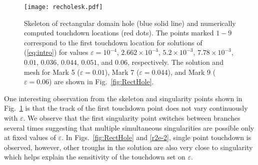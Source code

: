\documentclass{siamart0516}
\renewcommand{\eqref}[1]{(\ref{#1})}
\newcommand{\eps}{\varepsilon}
\theoremstyle{plain}%
\theoremstyle{definition}
\theoremstyle{remark}
\begin{document}

\begin{figure}[htbp]
\centering
\texttt{[image: recholesk.pdf]}
\caption{Skeleton of rectangular domain hole (blue solid line) and numerically computed touchdown locations (red dots).
The points marked $1-9$ correspond to the first touchdown location for solutions of \eqref{eq:intro} for values $\eps = 10^{-4}$, $2.662 \times 10^{-3}$, $5.2 \times 10^{-3}$, $7.78 \times 10^{-3}$, $0.01$, $0.036$, $0.044$, $0.051$, and $0.06$, respectively.
The solution and mesh for Mark 5 ($\eps = 0.01$), Mark 7 ($\eps = 0.044$), and
Mark 9 ($\eps = 0.06$) are shown in Fig.~\ref{fig:RectHole}.
\label{recsk}}
\end{figure}


One interesting observation from the skeleton and singularity points shown in Fig.~\ref{recsk} is that the track of the first touchdown point does not vary continuously with $\eps$. We observe that the first singularity point switches between branches several times suggesting that multiple simultaneous singularities are possible only at fixed values of $\eps$. In Figs.~\ref{fig:RectHole} and \ref{r2e-2}, single point touchdown is observed, however, other troughs in the solution are also very close to singularity which helps explain the sensitivity of the touchdown set on $\eps$.
\end{document}
